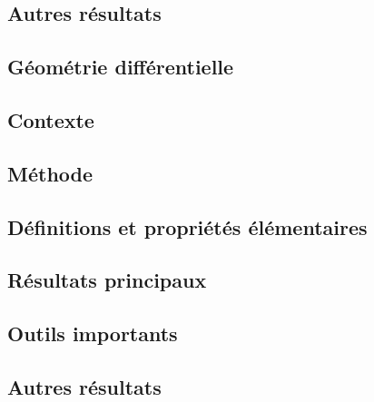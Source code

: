 \documentclass[12pt,a4paper]{article}
\begin{document}
\subsection*{Autres résultats}


\newpage
\begin{center}  
\section*{Géométrie différentielle} 
\end{center}

\subsection*{Contexte}

\subsection*{Méthode}

\subsection*{Définitions et propriétés élémentaires}

\subsection*{Résultats principaux}

\subsection*{Outils importants}


\subsection*{Autres résultats}
\end{document}
